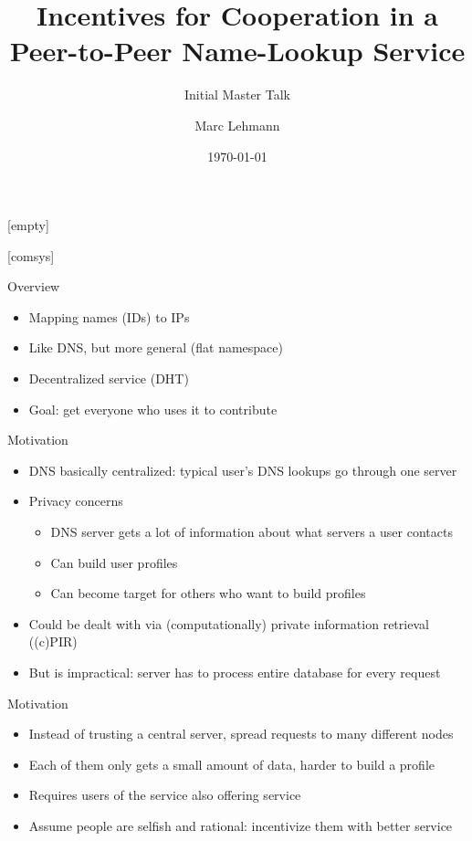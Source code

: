 \documentclass[presentation,english]{beamer}
\title[Peer-to-Peer Incentives]{Incentives for Cooperation in a Peer-to-Peer
Name-Lookup Service}
\author{Marc Lehmann}
\subtitle{Initial Master Talk}
\date{\today}
\begin{document}
[empty]
\begin{frame}
  \titlepage
\end{frame}

[comsys]

\begin{frame}{Overview}
  \begin{itemize}
    \item Mapping names (IDs) to IPs
    \item Like DNS, but more general (flat namespace)
    \item Decentralized service (DHT)
    \item Goal: get everyone who uses it to contribute
  \end{itemize}
\end{frame}

\begin{frame}{Motivation}
  \begin{itemize}
    \item DNS basically centralized: typical user's DNS lookups go through one
          server
    \item Privacy concerns
    \begin{itemize}
      \item DNS server gets a lot of information about what servers a user
            contacts
      \item Can build user profiles
      \item Can become target for others who want to build profiles
    \end{itemize}
    \item Could be dealt with via (computationally) private information
          retrieval ((c)PIR)
    \item But is impractical: server has to process entire database for every
          request
  \end{itemize}
\end{frame}

\begin{frame}{Motivation}
  \begin{itemize}
    \item Instead of trusting a central server, spread requests to many
          different nodes
    \item Each of them only gets a small amount of data, harder to build a
          profile
    \item Requires users of the service also offering service
    \item Assume people are selfish and rational: incentivize them with better
          service
  \end{itemize}
\end{frame}
\end{document}

